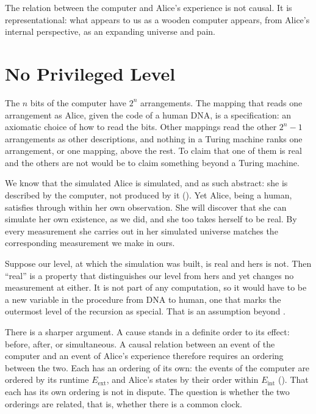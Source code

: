 \documentclass[11pt]{book}
\begin{document}
\begin{deduction}\label{ded:representational}
  The relation between the computer and Alice's experience is not causal.
  It is representational: what appears to us as a wooden computer appears,
  from Alice's internal perspective, as an expanding universe and pain.
\end{deduction}


\section{No Privileged Level}
\label{sec:no-privileged}

The $n$ bits of the computer have $2^n$ arrangements. The mapping that
reads one arrangement as Alice, given the code of a human DNA, is a
specification: an axiomatic choice of how to read the bits. Other
mappings read the other $2^n - 1$ arrangements as other descriptions, and
nothing in a Turing machine ranks one arrangement, or one mapping, above
the rest. To claim that one of them is real and the others are not would
be to claim something beyond a Turing machine.

We know that the simulated Alice is simulated, and as such abstract: she
is described by the computer, not produced by it
(). Yet Alice, being a human, satisfies
 through  within her own
observation. She will discover that she can simulate her own existence,
as we did, and she too takes herself to be real. By
 every measurement she carries out in her simulated
universe matches the corresponding measurement we make in ours.

Suppose our level, at which the simulation was built, is real and hers is
not. Then ``real'' is a property that distinguishes our level from hers
and yet changes no measurement at either. It is not part of any
computation, so it would have to be a new variable in the procedure from
DNA to human, one that marks the outermost level of the recursion as
special. That is an assumption beyond \AssumptionSet.

There is a sharper argument. A cause stands in a definite order to its
effect: before, after, or simultaneous. A causal relation between an event
of the computer and an event of Alice's experience therefore requires an
ordering between the two. Each has an ordering of its own: the events of
the computer are ordered by its runtime $E_{\mathrm{ext}}$, and Alice's
states by their order within $E_{\mathrm{int}}$ (). That
each has its own ordering is not in dispute. The question is whether the
two orderings are related, that is, whether there is a common clock.
 
\end{document}

